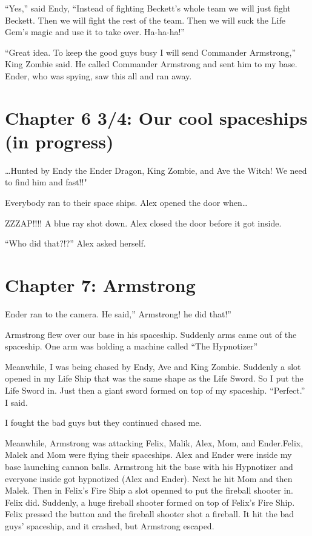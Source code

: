 \documentclass[12pt,oneside]{krantz}
\begin{document}
``Yes,'' said Endy, ``Instead of fighting Beckett's whole team we will
just fight Beckett. Then we will fight the rest of the team. Then we
will suck the Life Gem's magic and use it to take over. Ha-ha-ha!''

``Great idea. To keep the good guys busy I will send Commander
Armstrong,'' King Zombie said. He called Commander Armstrong and sent
him to my base. Ender, who was spying, saw this all and ran away.

\hypertarget{chapter-6-34-our-cool-spaceships-in-progress}{%
\chapter*{Chapter 6 3/4: Our cool spaceships (in
progress)}\label{chapter-6-34-our-cool-spaceships-in-progress}}

\ldots{}Hunted by Endy the Ender Dragon, King Zombie, and Ave the Witch!
We need to find him and fast!!"

Everybody ran to their space ships. Alex opened the door when\ldots{}

ZZZAP!!!! A blue ray shot down. Alex closed the door before it got
inside.

``Who did that?!?'' Alex asked herself.

\hypertarget{chapter-7-armstrong}{%
\chapter*{Chapter 7: Armstrong}\label{chapter-7-armstrong}}


Ender ran to the camera. He said,'' Armstrong! he did that!''

Armstrong flew over our base in his spaceship. Suddenly arms came out of
the spaceship. One arm was holding a machine called ``The Hypnotizer''

Meanwhile, I was being chased by Endy, Ave and King Zombie. Suddenly a
slot opened in my Life Ship that was the same shape as the Life Sword.
So I put the Life Sword in. Just then a giant sword formed on top of my
spaceship. ``Perfect.'' I said.

I fought the bad guys but they continued chased me.

Meanwhile, Armstrong was attacking Felix, Malik, Alex, Mom, and
Ender.Felix, Malek and Mom were flying their spaceships. Alex and Ender
were inside my base launching cannon balls. Armstrong hit the base with
his Hypnotizer and everyone inside got hypnotized (Alex and Ender). Next
he hit Mom and then Malek. Then in Felix's Fire Ship a slot openned to
put the fireball shooter in. Felix did. Suddenly, a huge fireball
shooter formed on top of Felix's Fire Ship. Felix pressed the button and
the fireball shooter shot a fireball. It hit the bad guys' spaceship,
and it crashed, but Armstrong escaped.
\end{document}
